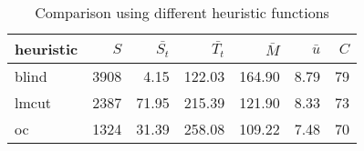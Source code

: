 \begin{table}[htbp]
\centering
\begin{tabular}{lrrrrrr}
  \hline
heuristic & $S$ & $\bar{S_t}$ & $\bar{T_t}$ & $\bar{M}$ & $\bar{u}$ & $C$ \\ 
  \hline
blind & 3908 & 4.15 & 122.03 & 164.90 & 8.79 &  79 \\ 
  lmcut & 2387 & 71.95 & 215.39 & 121.90 & 8.33 &  73 \\ 
  oc & 1324 & 31.39 & 258.08 & 109.22 & 7.48 &  70 \\ 
   \hline
\end{tabular}
\caption{Comparison using different heuristic functions} 
\label{tab:summary_heuristics2}
\end{table}
